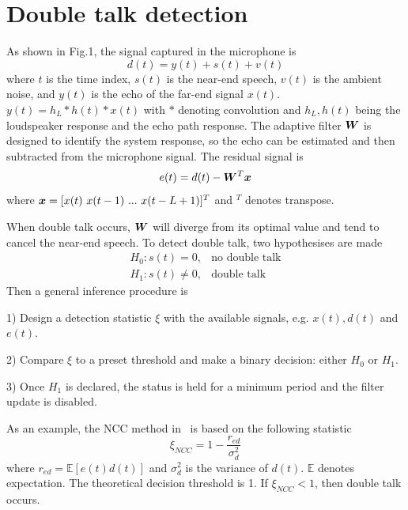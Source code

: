 \documentclass[a4paper]{article}
\begin{document}
\section{Double talk detection}

As shown in Fig.1, the signal captured in the microphone is
\begin{equation}\label{eq:micsig}
  d(t)=y(t)+s(t)+v(t)
\end{equation}
where $t$ is the time index, $s(t)$ is the near-end speech, $v(t)$ is the ambient noise, and $y(t)$ is the echo of the far-end signal $x(t)$. $y(t)=h_L*h(t)*x(t)$ with $*$ denoting convolution and $h_L, h(t)$ being the loudspeaker response and the echo path response. The adaptive filter $\bm{{W}}$ is designed to identify the system response, so the echo can be estimated and then subtracted from the microphone signal. The residual signal is
\begin{equation}\label{eq:err}
  e(t) = d(t) - \bm{{W}}^T\bm{{x}}
\end{equation}
where $\bm{{x}}=[x(t)~x(t-1)~...~x(t-L+1)]^T$ and $^T$ denotes transpose.

When double talk occurs, $\bm{{W}}$ will diverge from its optimal value and tend to cancel the near-end speech. To detect double talk, two hypothesises are made
\begin{eqnarray}
  H_0:  s(t)=0, &\text{no double talk} \\
  H_1:  s(t)\neq 0,& \text{double talk}
\end{eqnarray}
Then a general inference procedure is

1) Design a detection statistic $\xi$ with the available signals, e.g. $x(t),d(t)$ and $e(t)$.

2) Compare $\xi$ to a preset threshold and make a binary decision: either $H_0$ or $H_1$.

3) Once $H_1$ is declared, the status is held for a minimum period and the filter update is disabled.

As an example, the NCC method in~\cite{iqbal2007normalized} is based on the following statistic
\begin{equation}\label{eq:ncc}
  \xi_{NCC}=1-\frac{r_{ed}}{\sigma^2_d}
\end{equation}
where $r_{ed}=\mathbb{E}[e(t)d(t)]$ and $\sigma^2_d$ is the variance of $d(t)$. $\mathbb{E}$ denotes expectation. The theoretical decision threshold is 1. If $\xi_{NCC}<1$, then double talk occurs.
\end{document}
